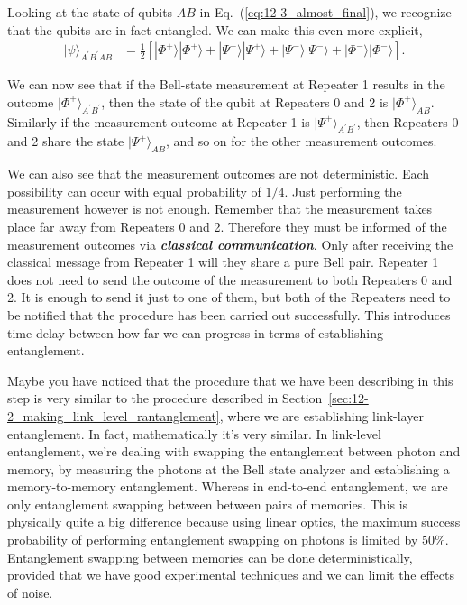 Looking at the state of qubits $AB$ in Eq.~(\ref{eq:12-3_almost_final}), we recognize that the qubits are in fact entangled.
We can make this even more explicit,
\begin{align}
    |\psi\rangle_{A^{\prime}B^{\prime}AB} & = \frac{1}{2} \left[ |\Phi^+\rangle |\Phi^+\rangle + |\Psi^+\rangle |\Psi^+\rangle + |\Psi^-\rangle |\Psi^-\rangle + |\Phi^-\rangle |\Phi^-\rangle \right].
    \label{eq:12-3_final}
\end{align}

We can now see that if the Bell-state measurement at Repeater 1 results in the outcome $|\Phi^+\rangle_{A^{\prime}B^{\prime}}$, then the state of the qubit at Repeaters 0 and 2 is $|\Phi^+\rangle_{AB}$.
Similarly if the measurement outcome at Repeater 1 is $|\Psi^+\rangle_{A^{\prime}B^{\prime}}$, then Repeaters 0 and 2 share the state $|\Psi^+\rangle_{AB}$, and so on for the other measurement outcomes.

We can also see that the measurement outcomes are not deterministic.
Each possibility can occur with equal probability of $1/4$.
Just performing the measurement however is not enough.
Remember that the measurement takes place far away from Repeaters 0 and 2.
Therefore they must be informed of the measurement outcomes via \textit{\textbf{classical communication}}.
Only after receiving the classical message from Repeater 1 will they share a pure Bell pair.
Repeater 1 does not need to send the outcome of the measurement to both Repeaters 0 and 2.
It is enough to send it just to one of them, but both of the Repeaters need to be notified that the procedure has been carried out successfully.
This introduces time delay between how far we can progress in terms of establishing entanglement.

Maybe you have noticed that the procedure that we have been describing in this step is very similar to the procedure described in Section~\ref{sec:12-2_making_link_level_rantanglement}, where we are establishing link-layer entanglement.
In fact, mathematically it's very similar.
In link-level entanglement, we're dealing with swapping the entanglement between photon and memory, by measuring the photons at the Bell state analyzer and establishing a memory-to-memory entanglement.
Whereas in end-to-end entanglement, we are only entanglement swapping between between pairs of memories.
This is physically quite a big difference because using linear optics, the maximum success probability of performing entanglement swapping on photons is limited by $50\%$.
Entanglement swapping between memories can be done deterministically, provided that we have good experimental techniques and we can limit the effects of noise.

